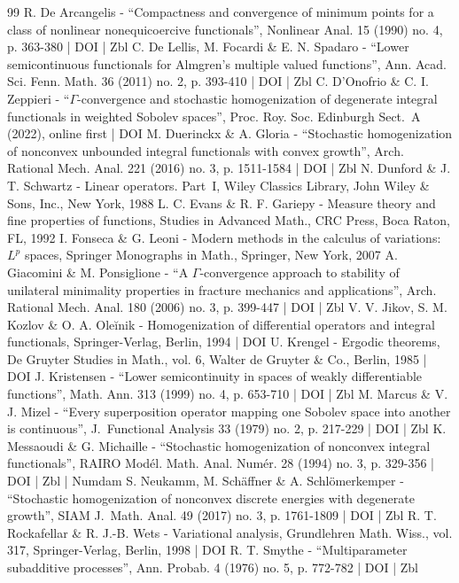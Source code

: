 \begin{thebibliography}{99}
R. De Arcangelis - “Compactness and convergence of minimum points for a class of nonlinear nonequicoercive functionals”, Nonlinear Anal. 15 (1990) no. 4, p. 363-380 | DOI | Zbl
C. De Lellis, M. Focardi \& E. N. Spadaro - “Lower semicontinuous functionals for Almgren’s multiple valued functions”, Ann. Acad. Sci. Fenn. Math. 36 (2011) no. 2, p. 393-410 | DOI | Zbl
C. D’Onofrio \& C. I. Zeppieri - “$\Gamma $-convergence and stochastic homogenization of degenerate integral functionals in weighted Sobolev spaces”, Proc. Roy. Soc. Edinburgh Sect. A (2022), online first | DOI
M. Duerinckx \& A. Gloria - “Stochastic homogenization of nonconvex unbounded integral functionals with convex growth”, Arch. Rational Mech. Anal. 221 (2016) no. 3, p. 1511-1584 | DOI | Zbl
N. Dunford \& J. T. Schwartz - Linear operators. Part I, Wiley Classics Library, John Wiley \& Sons, Inc., New York, 1988
L. C. Evans \& R. F. Gariepy - Measure theory and fine properties of functions, Studies in Advanced Math., CRC Press, Boca Raton, FL, 1992
I. Fonseca \& G. Leoni - Modern methods in the calculus of variations: $L^p$ spaces, Springer Monographs in Math., Springer, New York, 2007
A. Giacomini \& M. Ponsiglione - “A $\Gamma $-convergence approach to stability of unilateral minimality properties in fracture mechanics and applications”, Arch. Rational Mech. Anal. 180 (2006) no. 3, p. 399-447 | DOI | Zbl
V. V. Jikov, S. M. Kozlov \& O. A. Oleĭnik - Homogenization of differential operators and integral functionals, Springer-Verlag, Berlin, 1994 | DOI
U. Krengel - Ergodic theorems, De Gruyter Studies in Math., vol. 6, Walter de Gruyter \& Co., Berlin, 1985 | DOI
J. Kristensen - “Lower semicontinuity in spaces of weakly differentiable functions”, Math. Ann. 313 (1999) no. 4, p. 653-710 | DOI | Zbl
M. Marcus \& V. J. Mizel - “Every superposition operator mapping one Sobolev space into another is continuous”, J. Functional Analysis 33 (1979) no. 2, p. 217-229 | DOI | Zbl
K. Messaoudi \& G. Michaille - “Stochastic homogenization of nonconvex integral functionals”, RAIRO Modél. Math. Anal. Numér. 28 (1994) no. 3, p. 329-356 | DOI | Zbl | Numdam
S. Neukamm, M. Schäffner \& A. Schlömerkemper - “Stochastic homogenization of nonconvex discrete energies with degenerate growth”, SIAM J. Math. Anal. 49 (2017) no. 3, p. 1761-1809 | DOI | Zbl
R. T. Rockafellar \& R. J.-B. Wets - Variational analysis, Grundlehren Math. Wiss., vol. 317, Springer-Verlag, Berlin, 1998 | DOI
R. T. Smythe - “Multiparameter subadditive processes”, Ann. Probab. 4 (1976) no. 5, p. 772-782 | DOI | Zbl
\end{thebibliography}
